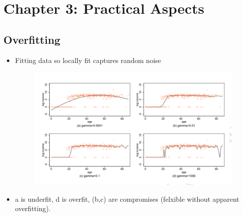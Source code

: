 \documentclass[12pt, oneside]{article}
\begin{document}
\newpage

\section{Chapter 3: Practical Aspects}
\subsection{Overfitting}
\begin{itemize}
    \item Fitting data so locally fit captures random noise
    \begin{figure}[ht]
    \centering
    \includegraphics[width=\textwidth]{Fit of SVM.png}       
    \label{fig:my_label}
    \end{figure}
\item a is underfit, d is overfit, (b,c) are compromises (felxible without apparent overfitting).
\end{itemize}
\end{document}
